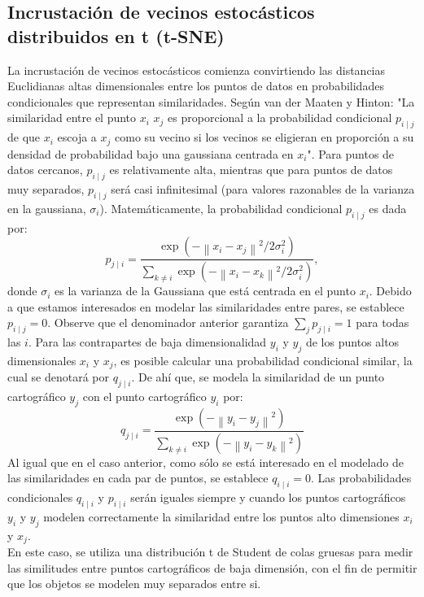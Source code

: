 \documentclass[spanish,11pt,letterpaper,oneside]{memoir}
\begin{document}
\subsection{Incrustación de vecinos estocásticos distribuidos en t (t-SNE)}
	 La incrustación de vecinos estocásticos comienza convirtiendo las distancias Euclidianas altas dimensionales entre los puntos de datos en probabilidades condicionales que representan similaridades. Según van der Maaten y Hinton: "La similaridad entre el punto $x_i$ $x_j$ es proporcional a la probabilidad condicional $p_{i\mid j}$ de que $x_i$ escoja a $x_j$ como su vecino si los vecinos se eligieran en proporción a su densidad de probabilidad bajo una gaussiana centrada en $x_i$". Para puntos de datos cercanos, $p_{i\mid j}$ es relativamente alta, mientras que para puntos de datos muy separados, $p_{i\mid j}$ será casi infinitesimal (para valores razonables de la varianza en la gaussiana, $\sigma_i$). Matemáticamente, la probabilidad condicional $p_{i\mid j}$ es dada por: 
	 \begin{equation}
	 	\label{eq:prob_cond}
	 	p_{j \mid i}=\frac{\exp \left(-\left\|x_i-x_j\right\|^2 / 2 \sigma_i^2\right)}{\sum_{k \neq i} \exp \left(-\left\|x_i-x_k\right\|^2 / 2 \sigma_i^2\right)},
	 \end{equation}
	donde $\sigma_i$ es la varianza de la Gaussiana que está centrada en el punto $x_i$. Debido a que estamos interesados en modelar las similaridades entre pares, se establece $p_{i\mid j} = 0$. Observe que el denominador anterior garantiza $\sum_j p_{j \mid i}=1$ para todas las $i$. Para las contrapartes de baja dimensionalidad $y_i$ y $y_j$ de los puntos altos dimensionales $x_i$ y $x_j$, es posible calcular una probabilidad condicional similar, la cual se denotará por $q_{j \mid i}$. De ahí que, se modela la similaridad de un punto cartográfico $y_j$ con el punto cartográfico $y_i$ por:
	\begin{equation}
		\label{eq:prob_cond_q}
		q_{j \mid i}=\frac{\exp \left(-\left\|y_i-y_j\right\|^2\right)}{\sum_{k \neq i} \exp \left(-\left\|y_i-y_k\right\|^2\right)}
	\end{equation}
	Al igual que en el caso anterior, como sólo se está interesado en el modelado de las similaridades en cada par de puntos, se establece $q_{i \mid i}=0$.
	Las probabilidades condicionales $q_{i \mid i}$ y $p_{i \mid i}$ serán iguales siempre y cuando los puntos cartográficos $y_i$ y $y_j$ modelen correctamente la similaridad entre los puntos alto dimensiones $x_i$ y $x_j$.\\ En este caso, se utiliza una distribución t de Student de colas gruesas para medir las similitudes entre puntos cartográficos de baja dimensión, con el fin de permitir que los objetos se modelen muy separados entre si. 
\end{document}
